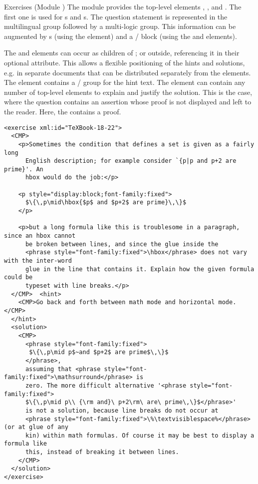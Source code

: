 \begin{tchapter}[id=quiz,short=Exercises]{Exercises (Module {})}
The {} module provides the top-level elements {},
{}, and {}. The first one is used for
{s} and {s}. The question statement is represented
in the multilingual {} group followed by a
multi-logic {} group. This information can be
augmented by {s} (using the {} element) and a
{}/{} block (using the {} and
{} elements).

The {} and {} elements can occur as children of
{}; or outside, referencing it in their optional
{} attribute. This allows a flexible positioning of the hints and
solutions, e.g. in separate documents that can be distributed separately from the
{} elements.  The {} element contains a
{}/{} group for the hint text. The {} element
can contain any number of {\omdoc} top-level elements to explain and justify the solution.
This is the case, where the question contains an assertion whose proof is not displayed
and left to the reader. Here, the {} contains a proof.

\begin{lstlisting}[label=lst:texbook-exercise,escapechar=\%,
  caption={An Exercise from the {\TeX}Book},
  index={exercise,hint,solution}]
<exercise xml:id="TeXBook-18-22">
  <CMP>
    <p>Sometimes the condition that defines a set is given as a fairly long
      English description; for example consider `{p|p and p+2 are prime}'. An 
      hbox would do the job:</p>

    <p style="display:block;font-family:fixed">
      $\{\,p\mid\hbox{$p$ and $p+2$ are prime}\,\}$
    </p>

    <p>but a long formula like this is troublesome in a paragraph, since an hbox cannot
      be broken between lines, and since the glue inside the 
      <phrase style="font-family:fixed">\hbox</phrase> does not vary with the inter-word
      glue in the line that contains it. Explain how the given formula could be
      typeset with line breaks.</p>
  </CMP>  <hint>
    <CMP>Go back and forth between math mode and horizontal mode.</CMP>
  </hint>
  <solution>
    <CMP>
      <phrase style="font-family:fixed">
       $\{\,p\mid p$~and $p+2$ are prime$\,\}$
      </phrase>,
      assuming that <phrase style="font-family:fixed">\mathsurround</phrase> is
      zero. The more difficult alternative '<phrase style="font-family:fixed">
      $\{\,p\mid p\\ {\rm and}\ p+2\rm\ are\ prime\,\}$</phrase>'
      is not a solution, because line breaks do not occur at 
      <phrase style="font-family:fixed">\%\textvisiblespace%</phrase> (or at glue of any
      kin) within math formulas. Of course it may be best to display a formula like
      this, instead of breaking it between lines.
    </CMP>
  </solution>
</exercise>
\end{lstlisting}


\end{tchapter}
